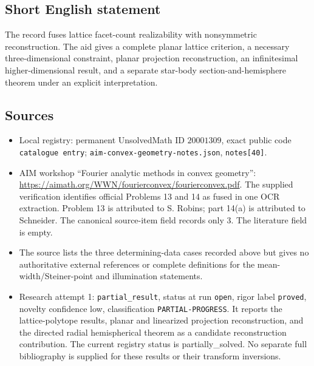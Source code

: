 \documentclass[11pt]{article}
\begin{document}
\subsection{Short English statement}
The record fuses lattice facet-count realizability with nonsymmetric reconstruction. The aid gives a complete planar lattice criterion, a necessary three-dimensional constraint, planar projection reconstruction, an infinitesimal higher-dimensional result, and a separate star-body section-and-hemisphere theorem under an explicit interpretation.
\subsection{Sources}
\begin{itemize}
\item Local registry: permanent UnsolvedMath ID \(20001309\), exact public code \texttt{catalogue entry}; \texttt{aim-convex-geometry-notes.json}, \texttt{notes[40]}.
\item AIM workshop ``Fourier analytic methods in convex geometry'': \url{https://aimath.org/WWN/fourierconvex/fourierconvex.pdf}. The supplied verification identifies official Problems 13 and 14 as fused in one OCR extraction. Problem 13 is attributed to S. Robins; part 14(a) is attributed to Schneider. The canonical source-item field records only 3. The literature field is empty.
\item The source lists the three determining-data cases recorded above but gives no authoritative external references or complete definitions for the mean-width/Steiner-point and illumination statements.
\item Research attempt 1: \texttt{partial\_result}, status at run \texttt{open}, rigor label \texttt{proved}, novelty confidence low, classification \texttt{PARTIAL-PROGRESS}. It reports the lattice-polytope results, planar and linearized projection reconstruction, and the directed radial hemispherical theorem as a candidate reconstruction contribution. The current registry status is partially_solved. No separate full bibliography is supplied for these results or their transform inversions.
\end{itemize}
\end{document}
